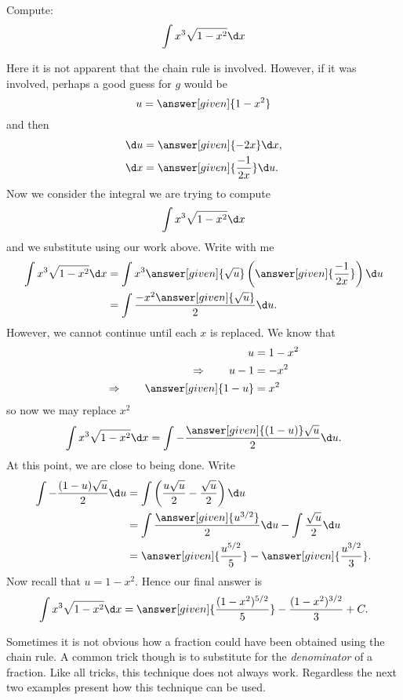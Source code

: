 \documentclass{ximera}
\begin{document}
\begin{example}
  Compute:
\[
\int x^3\sqrt{1-x^2}\d x
\]
\begin{explanation}
Here it is not apparent that the chain rule is involved. However, if
it was involved, perhaps a good guess for $g$ would be
\[
u = \answer[given]{1-x^2}
\]
and then
\begin{align*}
  \d u &= \answer[given]{-2x} \d x, \\
  \d x &= \answer[given]{\frac{-1}{2x}} \d u.
\end{align*}
Now we consider the integral we are trying to compute
\[
\int x^3\sqrt{1-x^2}\d x
\]
and we substitute using our work above. Write with me
\begin{align*}
  \int x^3\sqrt{1-x^2}\d x &= \int x^3 \answer[given]{\sqrt{u}} \left( \answer[given]{\frac{-1}{2x}} \right) \d u \\
  &= \int \frac{-x^2 \answer[given]{\sqrt{u}}}{2}\d u.
\end{align*}
However, we cannot continue until each $x$ is replaced. We know that
\begin{align*}
u &= 1-x^2 \\
\Rightarrow \qquad u -1 &= -x^2\\
\Rightarrow \qquad \answer[given]{1- u} &= x^2
\end{align*}
so now we may replace $x^2$
\[
\int x^3\sqrt{1-x^2}\d x = \int -\frac{\answer[given]{(1-u)} \sqrt{u}}{2}\d u.
\]
At this point, we are close to being done. Write
\begin{align*}
\int -\frac{(1-u)\sqrt{u}}{2}\d u &= \int \left(\frac{u\sqrt{u}}{2} - \frac{\sqrt{u}}{2}\right) \d u \\
&= \int \frac{\answer[given]{u^{3/2}}}{2} \d u - \int \frac{\sqrt{u}}{2} \d u \\
&= \answer[given]{\frac{u^{5/2}}{5}} - \answer[given]{\frac{u^{3/2}}{3}}.
\end{align*}
Now recall that $u = 1-x^2$. Hence our final answer is
\[
\int x^3\sqrt{1-x^2}\d x = \answer[given]{\frac{(1-x^2)^{5/2}}{5}} - \frac{(1-x^2)^{3/2}}{3}+C.
\]
\end{explanation}
\end{example}


Sometimes it is not obvious how a fraction could have been obtained
using the chain rule.  A common trick though is to substitute for the
\textit{denominator} of a fraction.  Like all tricks, this technique
does not always work. Regardless the next two examples present how
this technique can be used.
\end{document}
